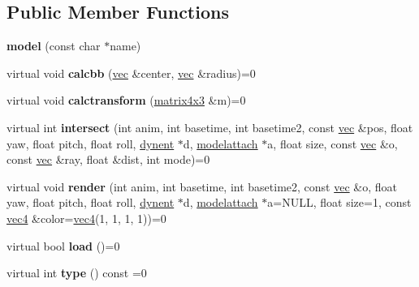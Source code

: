 \subsection*{Public Member Functions}
\begin{DoxyCompactItemize}
\item 
\mbox{\label{structmodel_a213aa611c23fbb156466ab49e890e0e8}} 
{\bfseries model} (const char $\ast$name)
\item 
\mbox{\label{structmodel_a0cbf1b5e57d238a4bdada7df7be80704}} 
virtual void {\bfseries calcbb} (\hyperlink{structvec}{vec} \&center, \hyperlink{structvec}{vec} \&radius)=0
\item 
\mbox{\label{structmodel_a95ce78930636de4108b92596a869b819}} 
virtual void {\bfseries calctransform} (\hyperlink{structmatrix4x3}{matrix4x3} \&m)=0
\item 
\mbox{\label{structmodel_ade9a780ef34e0fcb9f7417371c22825f}} 
virtual int {\bfseries intersect} (int anim, int basetime, int basetime2, const \hyperlink{structvec}{vec} \&pos, float yaw, float pitch, float roll, \hyperlink{structdynent}{dynent} $\ast$d, \hyperlink{structmodelattach}{modelattach} $\ast$a, float size, const \hyperlink{structvec}{vec} \&o, const \hyperlink{structvec}{vec} \&ray, float \&dist, int mode)=0
\item 
\mbox{\label{structmodel_a991dc94831e2d188a00e4b01a83f4ff8}} 
virtual void {\bfseries render} (int anim, int basetime, int basetime2, const \hyperlink{structvec}{vec} \&o, float yaw, float pitch, float roll, \hyperlink{structdynent}{dynent} $\ast$d, \hyperlink{structmodelattach}{modelattach} $\ast$a=N\+U\+LL, float size=1, const \hyperlink{structvec4}{vec4} \&color=\hyperlink{structvec4}{vec4}(1, 1, 1, 1))=0
\item 
\mbox{\label{structmodel_afc74ab3213555894a4a07781b2acbd3c}} 
virtual bool {\bfseries load} ()=0
\item 
\mbox{\label{structmodel_a657fa2ac2b8e7beaa51d1a53a78fd665}} 
virtual int {\bfseries type} () const =0
\item 
\mbox{\label{structmodel_a6e7d72b8a2e09ef0a0756dea12141d6e}} 

\end{DoxyCompactItemize}
